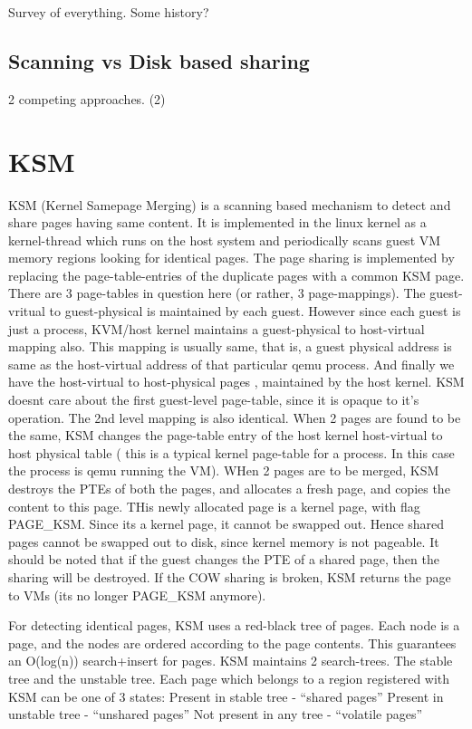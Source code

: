 \documentclass[10pt,a4paper]{article}
\begin{document}
Survey of everything. Some history?
\subsection{Scanning vs Disk based sharing}

2 competing approaches.
   (2)
\section{KSM}

KSM (Kernel Samepage Merging) is a scanning based mechanism to detect and share pages having same content. It is implemented in the linux kernel as a kernel-thread which runs on the host system and periodically scans guest VM memory regions looking for identical pages.
The page sharing is implemented by replacing the page-table-entries of the duplicate pages with a common KSM page.
There are 3 page-tables in question here (or rather, 3 page-mappings). The guest-vritual to guest-physical is maintained by each guest. However since each guest is just a process, KVM/host kernel maintains a guest-physical to host-virtual mapping also. This mapping is usually same, that is, a guest physical address is same as the host-virtual address of that particular qemu process. And finally we have the host-virtual to host-physical pages , maintained by the host kernel. 
KSM doesnt care about the first guest-level page-table, since it is opaque to it's operation. The 2nd level mapping is also identical. When 2 pages are found to be the same, KSM changes the page-table entry of the host kernel host-virtual to host physical table ( this is a typical kernel page-table for a process. In this case the process is qemu running the VM).
WHen 2 pages are to be merged, KSM destroys the PTEs of both the pages, and allocates a fresh page, and copies the content to this page. THis newly allocated page is a kernel page, with flag PAGE\_KSM. Since its a kernel page, it cannot be swapped out. Hence shared pages cannot be swapped out to disk, since kernel memory is not pageable.
It should be noted that if the guest changes the PTE of a shared page, then the sharing will be destroyed. 
If the COW sharing is broken, KSM returns the page to VMs (its no longer PAGE\_KSM anymore).

For detecting identical pages, KSM uses a red-black tree of pages. Each node is a page, and the nodes are ordered according to the page contents. This guarantees an O(log(n)) search+insert for pages.
KSM maintains 2 search-trees. The stable tree and the unstable tree. Each page which belongs to a region registered with KSM can be one of 3 states:
Present in stable tree - ``shared pages''
Present in unstable tree - ``unshared pages'' 
Not present in any tree - ``volatile pages''
\end{document}
